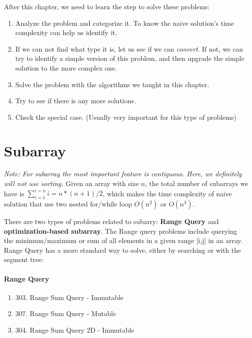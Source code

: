 \documentclass[../main.tex]{subfiles}
\begin{document}
After this chapter, we need to learn the step to solve these problems:
\begin{enumerate}
    \item Analyze the problem and categorize it.  To know the naive solution's time complexity can help us identify it.
    \item If we can not find what type it is, let us see if we can \textit{convert}. If not, we can try to identify a simple version of this problem, and then upgrade the simple solution to the more complex one. 
    \item Solve the problem with the algorithms we taught in this chapter.
    \item Try to see if there is any more solutions. 
    

    \item Check the special case. (Usually very important for this type of problems)
\end{enumerate}
\section{Subarray }
\textit{Note: For subarray the most important feature is contiguous. Here, we definitely will not use sorting.} Given an array with size $n$, the total number of subarrays we have is $\sum_{i=1}^{i=n} i = n*(n+1)/2$, which makes the time complexity of naive solution that use two nested for/while loop $O(n^2)$ or $O(n^3)$. 

There are two types of problems related to subarry: \textbf{Range Query} and \textbf{optimization-based subarray}.  The Range query problems include querying the minimum/maximum or sum of all elements in a given range [i,j] in an array. Range Query has a more standard way to solve, either by searching or with the segment tree:
\paragraph{Range Query}
\begin{enumerate}
    \item 303. Range Sum Query - Immutable
    \item 307. Range Sum Query - Mutable
    \item 304. Range Sum Query 2D - Immutable
\end{enumerate}
\end{document}

